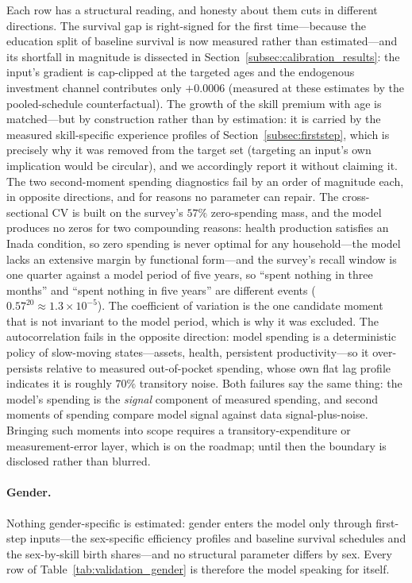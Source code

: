 \documentclass[12pt,a4paper]{article}
\begin{document}
Each row has a structural reading, and honesty about them cuts in different directions. The survival gap is right-signed for the first time---because the education split of baseline survival is now measured rather than estimated---and its shortfall in magnitude is dissected in Section~\ref{subsec:calibration_results}: the input's gradient is cap-clipped at the targeted ages and the endogenous investment channel contributes only $+0.0006$ (measured at these estimates by the pooled-schedule counterfactual). The growth of the skill premium with age is matched---but by construction rather than by estimation: it is carried by the measured skill-specific experience profiles of Section~\ref{subsec:firststep}, which is precisely why it was removed from the target set (targeting an input's own implication would be circular), and we accordingly report it without claiming it. The two second-moment spending diagnostics fail by an order of magnitude each, in opposite directions, and for reasons no parameter can repair. The cross-sectional CV is built on the survey's $57\%$ zero-spending mass, and the model produces no zeros for two compounding reasons: health production satisfies an Inada condition, so zero spending is never optimal for any household---the model lacks an extensive margin by functional form---and the survey's recall window is one quarter against a model period of five years, so ``spent nothing in three months'' and ``spent nothing in five years'' are different events ($0.57^{20}\approx 1.3\times10^{-5}$). The coefficient of variation is the one candidate moment that is not invariant to the model period, which is why it was excluded. The autocorrelation fails in the opposite direction: model spending is a deterministic policy of slow-moving states---assets, health, persistent productivity---so it over-persists relative to measured out-of-pocket spending, whose own flat lag profile indicates it is roughly $70\%$ transitory noise. Both failures say the same thing: the model's spending is the \emph{signal} component of measured spending, and second moments of spending compare model signal against data signal-plus-noise. Bringing such moments into scope requires a transitory-expenditure or measurement-error layer, which is on the roadmap; until then the boundary is disclosed rather than blurred.

\paragraph{Gender.} Nothing gender-specific is estimated: gender enters the model only through first-step inputs---the sex-specific efficiency profiles and baseline survival schedules and the sex-by-skill birth shares---and no structural parameter differs by sex. Every row of Table~\ref{tab:validation_gender} is therefore the model speaking for itself.
\end{document}
